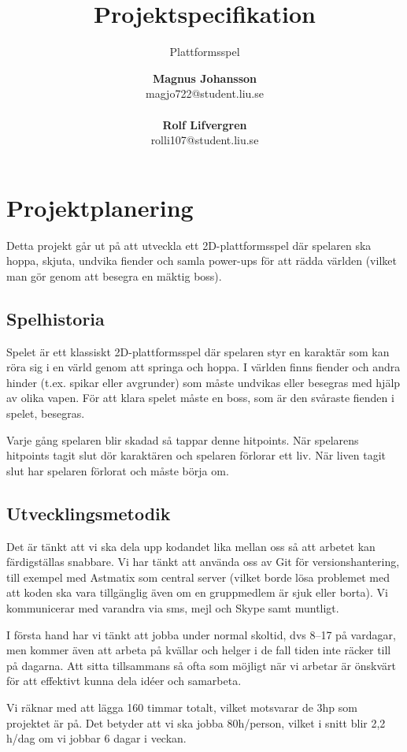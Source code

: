 \documentclass{scrartcl}
\author{\textbf{Magnus Johansson}\\
		magjo722@student.liu.se\\ \\
		\textbf{Rolf Lifvergren}\\
		rolli107@student.liu.se}
\title{Projektspecifikation}
\subtitle{Plattformsspel}
\begin{document}
\maketitle
\clearpage

\section{Projektplanering}
Detta projekt går ut på att utveckla ett 2D-plattformsspel där spelaren ska hoppa, skjuta, undvika fiender och samla power-ups för att rädda världen (vilket man gör genom att besegra en mäktig boss).

\subsection{Spelhistoria}
Spelet är ett klassiskt 2D-plattformsspel där spelaren styr en karaktär som kan röra sig i en värld genom att springa och hoppa. I världen finns fiender och andra hinder (t.ex. spikar eller avgrunder) som måste undvikas eller besegras med hjälp av olika vapen. För att klara spelet måste en boss, som är den svåraste fienden i spelet, besegras.

Varje gång spelaren blir skadad så tappar denne hitpoints. När spelarens hitpoints tagit slut dör karaktären och spelaren förlorar ett liv. När liven tagit slut har spelaren förlorat och måste börja om. 

\subsection{Utvecklingsmetodik}\label{utvecklingsmetodik}
Det är tänkt att vi ska dela upp kodandet lika mellan oss så att arbetet kan färdigställas snabbare. Vi har tänkt att använda oss av Git för versionshantering, till exempel med Astmatix som central server (vilket borde lösa problemet med att koden ska vara tillgänglig även om en gruppmedlem är sjuk eller borta). Vi kommunicerar med varandra via sms, mejl och Skype samt muntligt.

I första hand har vi tänkt att jobba under normal skoltid, dvs 8--17 på vardagar, men kommer även att arbeta på kvällar och helger i de fall tiden inte räcker till på dagarna. Att sitta tillsammans så ofta som möjligt när vi arbetar är önskvärt för att effektivt kunna dela idéer och samarbeta.

Vi räknar med att lägga 160 timmar totalt, vilket motsvarar de 3hp som projektet är på. Det betyder att vi ska jobba 80h/person, vilket i snitt blir 2{,}2 h/dag om vi jobbar 6 dagar i veckan.
\end{document}

